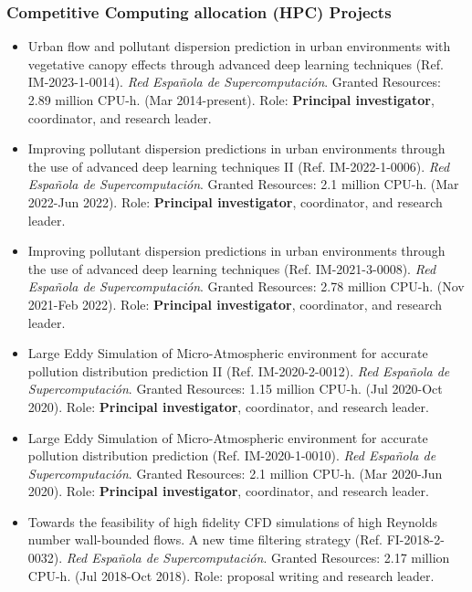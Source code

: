 \documentclass{article}
\begin{document}
\subsubsection{Competitive Computing allocation (HPC) Projects}

\begin{itemize}

\item Urban flow and pollutant dispersion prediction in urban environments with vegetative canopy effects through advanced deep learning techniques (Ref. IM-2023-1-0014). {\it Red Española de Supercomputación}. Granted Resources: 2.89 million CPU-h. (Mar 2014-present). Role: {\bf Principal investigator}, coordinator, and research leader.

\item Improving pollutant dispersion predictions in urban environments through the use of advanced deep learning techniques II (Ref. IM-2022-1-0006). {\it Red Española de Supercomputación}. Granted Resources: 2.1 million CPU-h. (Mar 2022-Jun 2022). Role: {\bf Principal investigator}, coordinator, and research leader.

\item Improving pollutant dispersion predictions in urban environments through the use of advanced deep learning techniques (Ref. IM-2021-3-0008). {\it Red Española de Supercomputación}. Granted Resources: 2.78 million CPU-h. (Nov 2021-Feb 2022). Role: {\bf Principal investigator}, coordinator, and research leader.

\item Large Eddy Simulation of Micro-Atmospheric environment for accurate pollution distribution prediction II (Ref. IM-2020-2-0012). {\it Red Española de Supercomputación}. Granted Resources: 1.15 million CPU-h. (Jul 2020-Oct 2020). Role: {\bf Principal investigator}, coordinator, and research leader.

\item Large Eddy Simulation of Micro-Atmospheric environment for accurate pollution distribution prediction (Ref. IM-2020-1-0010). {\it Red Española de Supercomputación}. Granted Resources: 2.1 million CPU-h. (Mar 2020-Jun 2020). Role: {\bf Principal investigator}, coordinator, and research leader.

\item Towards the feasibility of high fidelity CFD simulations of high Reynolds number wall-bounded flows. A new time filtering strategy (Ref. FI-2018-2-0032). {\it Red Española de Supercomputación}. Granted Resources: 2.17 million CPU-h. (Jul 2018-Oct 2018).  Role: proposal writing and research leader.


\end{itemize}
\end{document}
